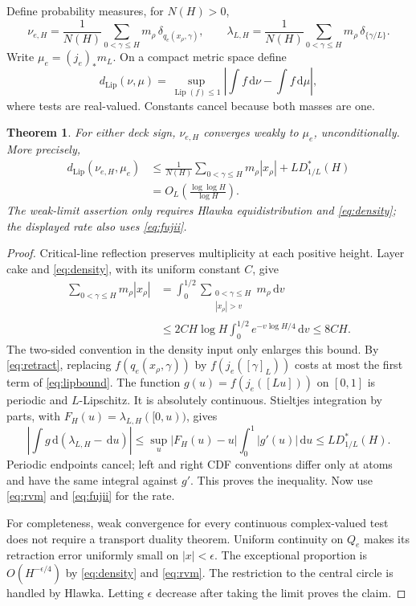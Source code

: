\documentclass[11pt,a4paper]{article}
\newtheorem{theorem}{Theorem}[section]
\theoremstyle{definition}
\theoremstyle{remark}
\newcommand{\dd}{\,\mathrm d}
\newcommand{\Lip}{\operatorname{Lip}}
\begin{document}
Define probability measures, for $N(H)>0$,
\begin{equation}\label{eq:empirical}
 \nu_{e,H}=\frac1{N(H)}\sum_{0<\gamma\le H}
              m_\rho\,\delta_{q_e(x_\rho,\gamma)},\qquad
 \lambda_{L,H}=\frac1{N(H)}\sum_{0<\gamma\le H}
              m_\rho\,\delta_{\{\gamma/L\}}.
\end{equation}
Write $\mu_e=(j_e)_*m_L$. On a compact metric space define
\[
 d_{\Lip}(\nu,\mu)=\sup_{\Lip(f)\le1}
      \left|\int f\dd\nu-\int f\dd\mu\right|,
\]
where tests are real-valued. Constants cancel because both masses are one.

\begin{theorem}\label{thm:limit}
For either deck sign, $\nu_{e,H}$ converges weakly to $\mu_e$,
unconditionally. More precisely,
\begin{align}
 d_{\Lip}(\nu_{e,H},\mu_e)
 &\le \frac1{N(H)}\sum_{0<\gamma\le H}m_\rho|x_\rho|
                 +L D_{1/L}^*(H) \label{eq:lipbound}\\
 &=O_L\!\left(\frac{\log\log H}{\log H}\right).\nonumber
\end{align}
The weak-limit assertion only requires Hlawka equidistribution and
\eqref{eq:density}; the displayed rate also uses \eqref{eq:fujii}.
\end{theorem}
\begin{proof}
Critical-line reflection preserves multiplicity at each positive height.
Layer cake and \eqref{eq:density}, with its uniform constant $C$, give
\begin{align*}
 \sum_{0<\gamma\le H}m_\rho|x_\rho|
 &=\int_0^{1/2}\sum_{\substack{0<\gamma\le H\\|x_\rho|>v}}
                     m_\rho\dd v\\
 &\le2CH\log H\int_0^{1/2}e^{-v\log H/4}\dd v
 \le8CH.
\end{align*}
The two-sided convention in the density input only enlarges this bound.
By \eqref{eq:retract}, replacing $f(q_e(x_\rho,\gamma))$ by
$f(j_e([\gamma]_L))$ costs at most the first term of \eqref{eq:lipbound}.
The function $g(u)=f(j_e([Lu]))$ on $[0,1]$ is periodic and $L$-Lipschitz.
It is absolutely continuous. Stieltjes integration by parts, with
$F_H(u)=\lambda_{L,H}([0,u))$, gives
\[
 \left|\int g\dd(\lambda_{L,H}-\dd u)\right|
 \le \sup_u|F_H(u)-u|\int_0^1|g'(u)|\dd u
 \le L D_{1/L}^*(H).
\]
Periodic endpoints cancel; left and right CDF conventions differ only at
atoms and have the same integral against $g'$. This proves the inequality.
Now use \eqref{eq:rvm} and \eqref{eq:fujii} for the rate.

For completeness, weak convergence for every continuous complex-valued test
does not require a transport duality theorem. Uniform continuity on $Q_e$
makes its retraction error uniformly small on $|x|<\epsilon$. The exceptional
proportion is $O(H^{-\epsilon/4})$ by \eqref{eq:density} and \eqref{eq:rvm}.
The restriction to the central circle is handled by Hlawka. Letting
$\epsilon$ decrease after taking the limit proves the claim.
\end{proof}
\end{document}
